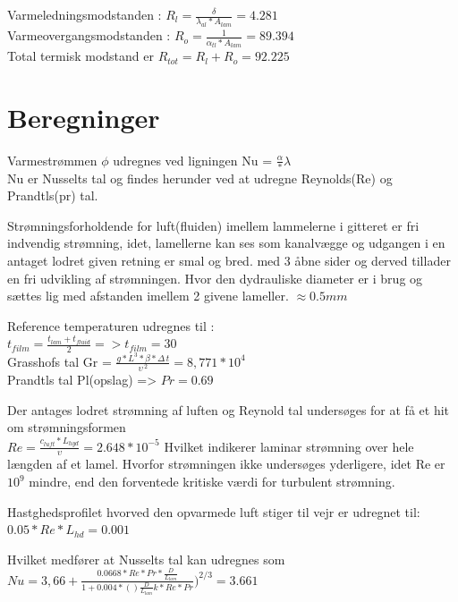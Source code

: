 Varmeledningsmodstanden : $R_l = \frac{\delta}{\lambda_{al}*A_{lam}} = 4.281$ \\
Varmeovergangsmodstanden : $R_o = \frac{1}{\alpha_{tl}*A_{lam}} = 89.394$ \\

Total termisk modstand er $R_{tot} = R_l + R_o = 92.225$ \\

\section{Beregninger}

Varmestrømmen $\phi$ udregnes ved ligningen Nu = $\frac{\alpha}*{\lambda}$ \\
Nu er Nusselts tal og findes herunder ved at udregne Reynolds(Re) og Prandtls(pr) tal.


Strømningsforholdende for luft(fluiden) imellem lammelerne i gitteret er fri indvendig strømning, idet, lamellerne kan ses som kanalvægge og udgangen i en antaget lodret given retning er smal og bred. med 3 åbne sider og derved tillader en fri udvikling af strømningen. Hvor den dydrauliske diameter er i brug og sættes lig med afstanden imellem 2 givene lameller. $\approx 0.5 mm$

Reference temperaturen udregnes til : 
\\$t_{film} = \frac{{t_{lam}}+t_{fluid}}{2} => t_{film}=30$
\\Grasshofs tal Gr = $\frac{g*L^3*\beta*{\Delta\,t}}{\upsilon\,^2} = 8,771*10^4$
\\Prandtls tal Pl(opslag) => $Pr=0.69$


Der antages lodret  strømning af luften og Reynold tal undersøges for at få et hit om strømningsformen\\

$Re = \frac{c_{luft}*L_{hyd}}{\upsilon} = 2.648*10^{-5}$
Hvilket indikerer laminar strømning over hele længden af et lamel. 
Hvorfor strømningen ikke undersøges yderligere, idet Re er $10^9$ mindre, end den forventede kritiske værdi for turbulent strømning.

Hastghedsprofilet hvorved den opvarmede luft stiger til vejr er udregnet til: 
$0.05*Re*L_{hd} = 0.001 $

Hvilket medfører at Nusselts tal kan udregnes som \\ 
$Nu = 3,66+ \frac{0.0668*Re*Pr*\frac{D}{L_{lam}}}{1+0.004*()\frac{D}{L_{lam}}k *Re*Pr})^{2/3} = 3.661$


